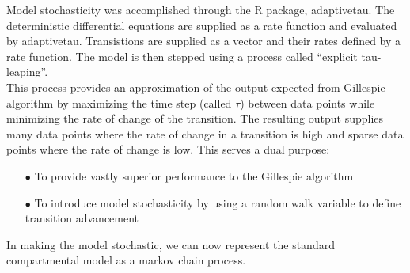 \documentclass[../Paper.tex]{subfiles}
\begin{document}
\raggedright
Model stochasticity was accomplished through the R package, adaptivetau.
The deterministic differential equations are supplied as a rate function and evaluated
by adaptivetau. Transistions are supplied as a vector and their rates defined by
a rate function. The model is then stepped using a process called
``explicit tau-leaping''\cite{yang_gillespie_petzold_2007}.
\\
This process provides an approximation of the output expected from Gillespie algorithm by maximizing
the time step (called $\tau$) between data points while minimizing the rate of change
of the transition. The resulting output supplies many data points where the rate of
change in a transition is high and sparse data points where the rate
of change is low. This serves a dual purpose:

\begin{enumerate}
  \item[$\bullet$]{To provide vastly superior performance to the Gillespie algorithm}
  \item[$\bullet$]{To introduce model stochasticity by using a random walk variable
                   to define transition advancement}
\end{enumerate}

In making the model stochastic, we can now represent the standard compartmental model
as a markov chain process.
\end{document}
